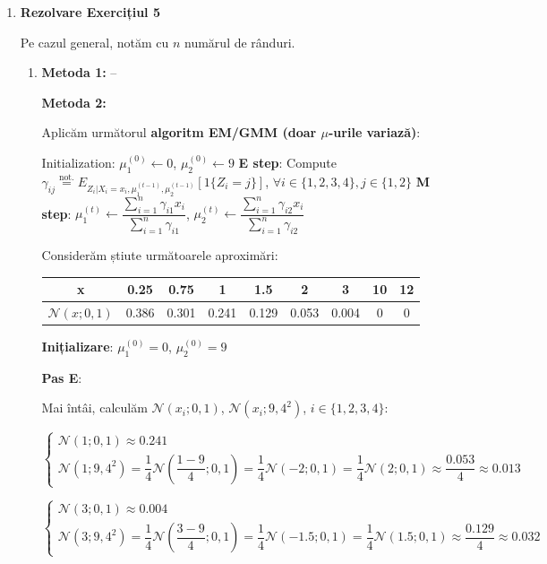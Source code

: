 \documentclass[12pt]{article}
\begin{document}
\begin{enumerate}
		\item \textbf{Rezolvare Exercițiul 5}
		
		Pe cazul general, notăm cu $n$ numărul de rânduri.
		
		\begin{enumerate}
			\item \textbf{Metoda 1:} --
			
			\textbf{Metoda 2:}
			
			Aplicăm următorul \textbf{algoritm EM/GMM (doar $\mu$-urile variază)}:
			\begin{algorithmic}
				\STATE Initialization: $\mu_1^{(0)}\gets 0$, $\mu_2^{(0)}\gets 9$
				\STATE \textbf{E step}: Compute $\gamma_{ij} \stackrel{\text{not.}}{=} E_{Z_i|X_i=x_i,\mu_1^{(t-1)},\mu_2^{(t-1)} }[1\{Z_i=j\}]$, $\forall i \in \{1,2,3,4\}, j\in \{1,2\}$
				\STATE \textbf{M step}: $\mu_1^{(t)} \gets \dfrac{\sum_{i=1}^{n} \gamma_{i1} x_i}{\sum_{i=1}^{n} \gamma_{i1}}$, $\mu_2^{(t)} \gets \dfrac{\sum_{i=1}^{n} \gamma_{i2} x_i}{\sum_{i=1}^{n} \gamma_{i2}}$
				\ENDFOR
			\end{algorithmic}
		
			Considerăm știute următoarele aproximări:
			
			\begin{tabular}{ |c|c|c|c|c|c|c|c|c| } 
				\hline
				x & 0.25 & 0.75 & 1 & 1.5 & 2 & 3 & 10 & 12 \\ 
				\hline
				$\mathcal{N}(x;0,1)$ & 0.386 & 0.301 & 0.241 & 0.129 & 0.053 & 0.004 & 0 & 0 \\ 
				\hline
			\end{tabular}
		
			\textbf{Inițializare}: $\mu_1^{(0)} = 0$, $\mu_2^{(0)} = 9$
		
			\textbf{Pas E}:
			
			Mai întâi, calculăm $\mathcal{N}(x_i;0,1)$, $\mathcal{N}(x_i;9,4^2)$, $i \in\{1,2,3,4\}$:
			
			$\begin{cases}
				\mathcal{N}(1;0,1) \approx 0.241\\
				\mathcal{N}(1;9,4^2) = \dfrac{1}{4} \mathcal{N}\left(\dfrac{1-9}{4};0,1\right) = \dfrac{1}{4} \mathcal{N}\left(-2;0,1\right) = \dfrac{1}{4} \mathcal{N}\left(2;0,1\right) \approx \dfrac{0.053}{4} \approx 0.013
			\end{cases}$

			$\begin{cases}
			\mathcal{N}(3;0,1) \approx 0.004\\
			\mathcal{N}(3;9,4^2) = \dfrac{1}{4} \mathcal{N}\left(\dfrac{3-9}{4};0,1\right) = \dfrac{1}{4} \mathcal{N}\left(-1.5;0,1\right) = \dfrac{1}{4} \mathcal{N}\left(1.5;0,1\right) \approx \dfrac{0.129}{4} \approx 0.032
			\end{cases}$
		

\end{enumerate}
\end{enumerate}
\end{document}
